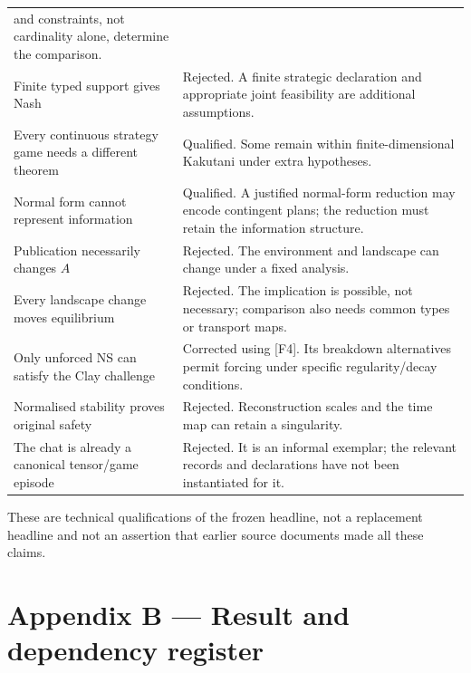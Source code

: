 \documentclass[11pt,a4paper]{article}
\begin{document}
\begin{longtable}[]{@{}
  >{\raggedright\arraybackslash}p{}
  >{\raggedright\arraybackslash}p{}@{}}
and constraints, not cardinality alone, determine the comparison. \\
Finite typed support gives Nash & Rejected. A finite strategic
declaration and appropriate joint feasibility are additional
assumptions. \\
Every continuous strategy game needs a different theorem & Qualified.
Some remain within finite-dimensional Kakutani under extra
hypotheses. \\
Normal form cannot represent information & Qualified. A justified
normal-form reduction may encode contingent plans; the reduction must
retain the information structure. \\
Publication necessarily changes \(A\) & Rejected. The environment and
landscape can change under a fixed analysis. \\
Every landscape change moves equilibrium & Rejected. The implication is
possible, not necessary; comparison also needs common types or transport
maps. \\
Only unforced NS can satisfy the Clay challenge & Corrected using
{[}F4{]}. Its breakdown alternatives permit forcing under specific
regularity/decay conditions. \\
Normalised stability proves original safety & Rejected. Reconstruction
scales and the time map can retain a singularity. \\
The chat is already a canonical tensor/game episode & Rejected. It is an
informal exemplar; the relevant records and declarations have not been
instantiated for it. \\
\end{longtable}

These are technical qualifications of the frozen headline, not a
replacement headline and not an assertion that earlier source documents
made all these claims.

\clearpage

\section*{Appendix B --- Result and dependency
register}\label{appendix-b-result-and-dependency-register}
\end{document}
